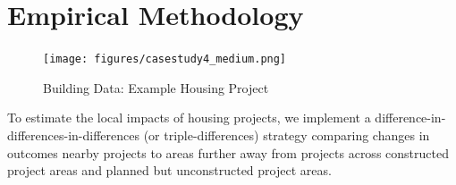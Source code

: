 \documentclass[12pt]{article}
\begin{document}





\section{Empirical Methodology}\label{section:methodology}


\begin{figure}[t!]
        \centering
        \caption[ Building Data: Example Housing Project]
        {\small Building Data: Example Housing Project } 
        \vspace{2mm}
\texttt{[image: figures/casestudy4\_medium.png]}
        \label{fig:bblumaps}
        \small
\end{figure} 

To estimate the local impacts of housing projects, we implement a difference-in-differences-in-differences (or triple-differences) strategy comparing changes in outcomes nearby projects to areas further away from projects across constructed project areas and planned but unconstructed project areas.  
\end{document}

